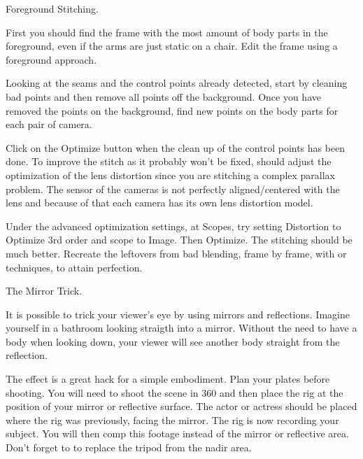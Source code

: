 \begin{fullwidth}

\clearpage
{\large Foreground Stitching. \par}

First you should find the frame with the most amount of body parts in the foreground, even if the arms are just static on a chair. Edit the frame using a foreground approach.

Looking at the seams and the control points already detected, start by cleaning bad points and then remove all points off the background. Once you have removed the points on the background, find new points on the body parts for each pair of camera.

Click on the Optimize button when the clean up of the control points has been done. To improve the stitch as it probably won’t be fixed, should adjust the optimization of the lens distortion since you are stitching a complex parallax problem. The sensor of the cameras is not perfectly aligned/centered with the lens and because of that each camera has its own lens distortion model. 

Under the advanced optimization settings, at Scopes, try setting Distortion to Optimize 3rd order and scope to Image. Then Optimize. The stitching should be much better. Recreate the leftovers from bad blending, frame by frame, with \textbf{} or \textbf{} techniques, to attain perfection.

{\large The Mirror Trick. \par}

It is possible to trick your viewer's eye by using mirrors and reflections. Imagine yourself in a bathroom looking straigth into a mirror. Without the need to have a body when looking down, your viewer will see another body straight from the reflection. 

The effect is a great hack for a simple embodiment. Plan your plates before shooting. You will need to shoot the scene in 360 and then place the rig at the position of your mirror or reflective surface. The actor or actress should be placed where the rig was previously, facing the mirror. The rig is now recording your subject. You will then comp this footage instead of the mirror or reflective area. Don't forget to \textbf{} to replace the tripod from the nadir area.


\clearpage
\end{fullwidth}
